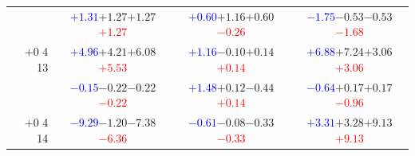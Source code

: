 \documentclass[compress]{beamer}
\begin{document}
\begin{frame}
\begin{tabular}{r | c | c | c}
          & \textcolor{blue}{$+1.31$}\hspace{0.1 cm}$+1.27$\hspace{0.1 cm}$+1.27$\hspace{0.1 cm}\textcolor{red}{$+1.27$} & \textcolor{blue}{$+0.60$}\hspace{0.1 cm}$+1.16$\hspace{0.1 cm}$+0.60$\hspace{0.1 cm}\textcolor{red}{$-0.26$} & \textcolor{blue}{$-1.75$}\hspace{0.1 cm}$-0.53$\hspace{0.1 cm}$-0.53$\hspace{0.1 cm}\textcolor{red}{$-1.68$} \\
$+$0 4 13 & \textcolor{blue}{$+4.96$}\hspace{0.1 cm}$+4.21$\hspace{0.1 cm}$+6.08$\hspace{0.1 cm}\textcolor{red}{$+5.53$} & \textcolor{blue}{$+1.16$}\hspace{0.1 cm}$-0.10$\hspace{0.1 cm}$+0.14$\hspace{0.1 cm}\textcolor{red}{$+0.14$} & \textcolor{blue}{$+6.88$}\hspace{0.1 cm}$+7.24$\hspace{0.1 cm}$+3.06$\hspace{0.1 cm}\textcolor{red}{$+3.06$} \\
          & \textcolor{blue}{$-0.15$}\hspace{0.1 cm}$-0.22$\hspace{0.1 cm}$-0.22$\hspace{0.1 cm}\textcolor{red}{$-0.22$} & \textcolor{blue}{$+1.48$}\hspace{0.1 cm}$+0.12$\hspace{0.1 cm}$-0.44$\hspace{0.1 cm}\textcolor{red}{$+0.14$} & \textcolor{blue}{$-0.64$}\hspace{0.1 cm}$+0.17$\hspace{0.1 cm}$+0.17$\hspace{0.1 cm}\textcolor{red}{$-0.96$} \\
$+$0 4 14 & \textcolor{blue}{$-9.29$}\hspace{0.1 cm}$-1.20$\hspace{0.1 cm}$-7.38$\hspace{0.1 cm}\textcolor{red}{$-6.36$} & \textcolor{blue}{$-0.61$}\hspace{0.1 cm}$-0.08$\hspace{0.1 cm}$-0.33$\hspace{0.1 cm}\textcolor{red}{$-0.33$} & \textcolor{blue}{$+3.31$}\hspace{0.1 cm}$+3.28$\hspace{0.1 cm}$+9.13$\hspace{0.1 cm}\textcolor{red}{$+9.13$} \\

\end{tabular}
\end{frame}
\end{document}
